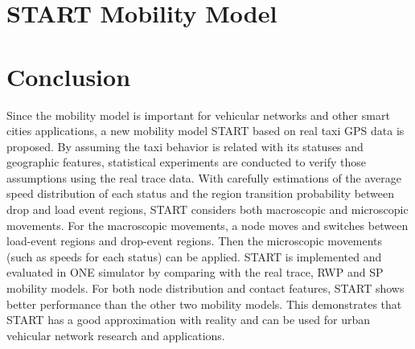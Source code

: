 \documentclass[10pt,conference,compsocconf,letterpaper]{IEEEtran}
\begin{document}




\section{START Mobility Model}
\label{section_modeling}







%



\section{Conclusion}
\label{section_conclusion}
Since the mobility model is important for vehicular networks and other smart cities applications, a new mobility model START based on real taxi GPS data is proposed. By assuming the taxi behavior is related with its statuses and geographic features, statistical experiments are conducted to verify those assumptions using the real trace data. With carefully estimations of the average speed distribution of each status and the region transition probability between drop and load event regions, START considers both macroscopic and microscopic movements. For the macroscopic movements, a node moves and switches between load-event regions and drop-event regions. Then the microscopic movements (such as speeds for each status) can be applied. START is implemented and evaluated in ONE simulator by comparing with the real trace, RWP and SP mobility models.
For both node distribution and contact features, START shows better performance than the other two mobility models. This demonstrates that START has a good approximation with reality and can be used for urban vehicular network research and applications.


%
%
\end{document}
